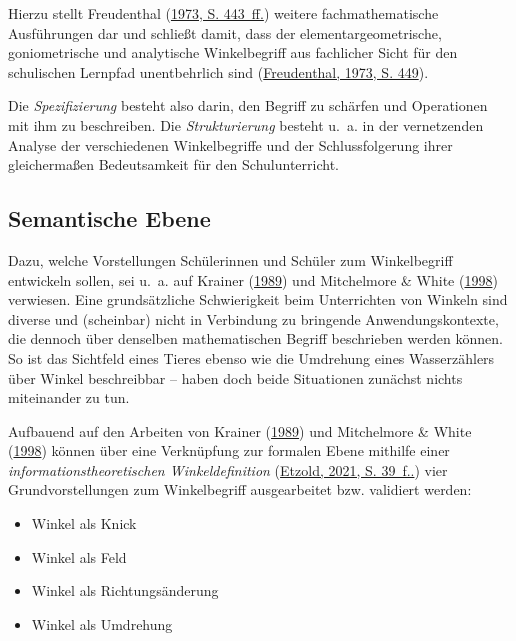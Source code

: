 \documentclass[
]{scrbook}
\providecommand{\tightlist}{%
  \setlength{\itemsep}{0pt}\setlength{\parskip}{0pt}}
\theoremstyle{definition}
\theoremstyle{definition}
\theoremstyle{definition}
\theoremstyle{definition}
\theoremstyle{remark}
\begin{document}
Hierzu stellt Freudenthal (\protect\hyperlink{ref-Freudenthal:1973}{1973, S. 443~ff.}) weitere fachmathematische Ausführungen dar und schließt damit, dass der elementargeometrische, goniometrische und analytische Winkelbegriff aus fachlicher Sicht für den schulischen Lernpfad unentbehrlich sind (\protect\hyperlink{ref-Freudenthal:1973}{Freudenthal, 1973, S. 449}).

Die \emph{Spezifizierung} besteht also darin, den Begriff zu schärfen und Operationen mit ihm zu beschreiben. Die \emph{Strukturierung} besteht u.~a. in der vernetzenden Analyse der verschiedenen Winkelbegriffe und der Schlussfolgerung ihrer gleichermaßen Bedeutsamkeit für den Schulunterricht.

\hypertarget{semantische-ebene}{%
\subsection{Semantische Ebene}\label{semantische-ebene}}

Dazu, welche Vorstellungen Schülerinnen und Schüler zum Winkelbegriff entwickeln sollen, sei u.~a. auf Krainer (\protect\hyperlink{ref-Krainer:1989}{1989}) und Mitchelmore \& White (\protect\hyperlink{ref-Mitchelmore:1998}{1998}) verwiesen. Eine grundsätzliche Schwierigkeit beim Unterrichten von Winkeln sind diverse und (scheinbar) nicht in Verbindung zu bringende Anwendungskontexte, die dennoch über denselben mathematischen Begriff beschrieben werden können. So ist das Sichtfeld eines Tieres ebenso wie die Umdrehung eines Wasserzählers über Winkel beschreibbar -- haben doch beide Situationen zunächst nichts miteinander zu tun.

Aufbauend auf den Arbeiten von Krainer (\protect\hyperlink{ref-Krainer:1989}{1989}) und Mitchelmore \& White (\protect\hyperlink{ref-Mitchelmore:1998}{1998}) können über eine Verknüpfung zur formalen Ebene mithilfe einer \emph{informationstheoretischen Winkeldefinition} (\protect\hyperlink{ref-Etzold2021}{Etzold, 2021, S. 39~f..}) vier Grundvorstellungen zum Winkelbegriff ausgearbeitet bzw. validiert werden:

\begin{itemize}
\tightlist
\item
  Winkel als Knick
\item
  Winkel als Feld
\item
  Winkel als Richtungsänderung
\item
  Winkel als Umdrehung
\end{itemize}
\end{document}
